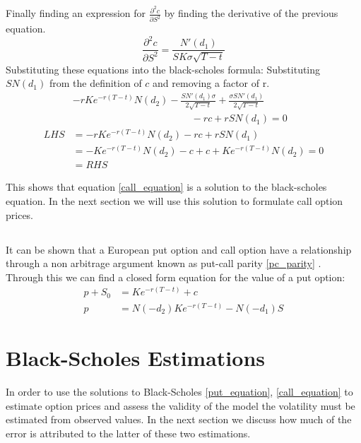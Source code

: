\documentclass{sig-alternate-05-2015}
\begin{document}
\subsection{}
Finally finding an expression for $\frac{\partial^2 c}{\partial S^2}$ by finding the derivative of the previous equation. 
\begin{equation}
\frac{\partial^2 c}{\partial S^2} = \frac{N'(d_1)}{SK\sigma\sqrt{T-t}}
\end{equation}
Substituting these equations into the black-scholes formula:
Substituting $SN(d_1)$ from the definition of $c$ and removing a factor of r. 
\begin{align*}
&-rKe^{-r(T-t)}N(d_2)-\frac{SN'(d_1)\sigma}{2\sqrt{T-t}} + \frac{\sigma SN'(d_1)}{2\sqrt{T-t}} \\ & \qquad \qquad \qquad \qquad \qquad \qquad - rc + rSN(d_1) = 0 \\
LHS &= -rKe^{-r(T-t)}N(d_2) - rc + rSN(d_1)\\
&= -Ke^{-r(T-t)}N(d_2) - c + c + Ke^{-r(T-t)}N(d_2) = 0 
\\ &= RHS
\end{align*}

This shows that equation \ref{call_equation} is a solution to the black-scholes equation. In the next section we will use this solution to formulate call option prices.

\subsection{}
It can be shown that a European put option and call option have a relationship through a non arbitrage argument known as put-call parity \eqref{pc_parity} \cite{book1}. Through this we can find a closed form equation for the value of a put option:
\begin{align}
p + S_0 &= Ke^{-r(T-t)} + c \label{pc_parity}\\
p &= N(-d_2)Ke^{-r(T-t)} - N(-d_1)S \label{put_equation}
\end{align} 

\section{Black-Scholes Estimations}
In order to use the solutions to Black-Scholes \eqref{put_equation}, \eqref{call_equation} to estimate option prices and assess the validity of the model the volatility must be estimated from observed values. In the next section we discuss how much of the error is attributed to the latter of these two estimations. 
\end{document}
